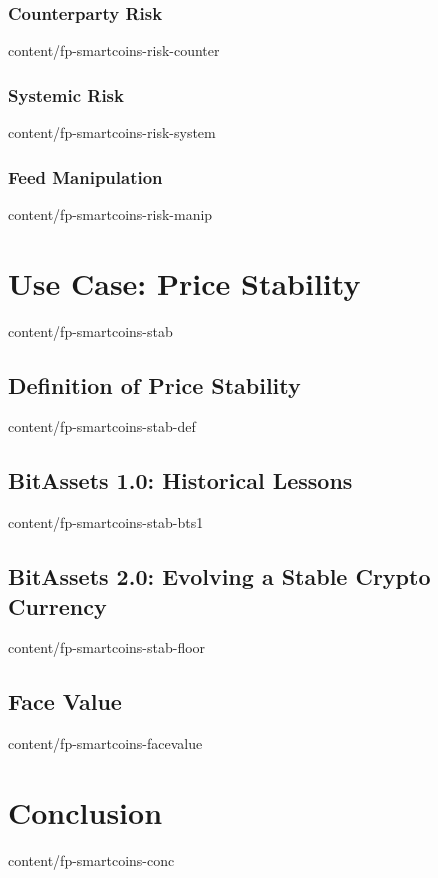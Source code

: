 \documentclass{btswhitepaper}
\begin{document}
\subsubsection { Counterparty Risk                                }  { content/fp-smartcoins-risk-counter}
\subsubsection { Systemic Risk                                    }  { content/fp-smartcoins-risk-system }
\subsubsection { Feed Manipulation                                }  { content/fp-smartcoins-risk-manip  }

\section       { Use Case: Price Stability                        }  { content/fp-smartcoins-stab        }
\subsection    { Definition of Price Stability                    }  { content/fp-smartcoins-stab-def    }
\subsection    { BitAssets 1.0: Historical Lessons                }  { content/fp-smartcoins-stab-bts1   }
\subsection    { BitAssets 2.0: Evolving a Stable Crypto Currency }  { content/fp-smartcoins-stab-floor  }
\subsection    { Face Value                                       }  { content/fp-smartcoins-facevalue   }


\section       { Conclusion                                       }  { content/fp-smartcoins-conc        }


\end{document}
